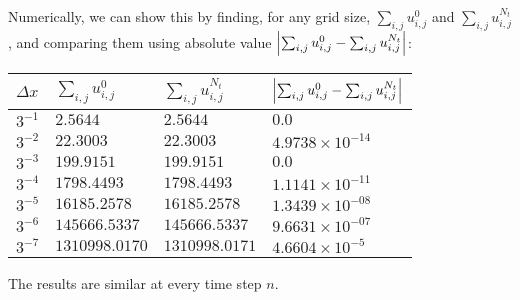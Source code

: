 \documentclass{article} %
\theoremstyle{plain}
\newcommand{\Dx}{\Delta x}
\numberwithin{equation}{section} %
\numberwithin{figure}{section} %
\numberwithin{table}{section} %
\begin{document}
\begin{enumerate}[\ \ (a)]
        Numerically, we can show this by finding, for any grid size, $\sum_{i,j}u_{i,j}^0$ and $\sum_{i,j}u_{i,j}^{N_t}$, and comparing them using absolute value $\abs{\sum_{i,j}u_{i,j}^0 - \sum_{i,j}u_{i,j}^{N_t}}$:
        \begin{table}[ht!]
            \centering
            \begin{tabular}{||l|l|l|l||}\hline\hline
                $\Dx$ & $\sum_{i,j}u_{i,j}^0$ & $\sum_{i,j}u_{i,j}^{N_t}$ & $\abs{\sum_{i,j}u_{i,j}^0 - \sum_{i,j}u_{i,j}^{N_t}}$ \\\hline\hline
                $3^{-1}$ & $2.5644$ & $2.5644$ & $0.0$ \\\hline
                $3^{-2}$ & $22.3003$ & $22.3003$ & $4.9738\times10^{-14}$ \\\hline
                $3^{-3}$ & $199.9151$ & $199.9151$ & $0.0$ \\\hline
                $3^{-4}$ & $1798.4493$ & $1798.4493$ & $1.1141\times10^{-11}$ \\\hline
                $3^{-5}$ & $16185.2578$ & $16185.2578$ & $1.3439\times10^{-08}$ \\\hline
                $3^{-6}$ & $145666.5337$ & $145666.5337$ & $9.6631\times10^{-07}$ \\\hline
                $3^{-7}$ & $1310998.0170$ & $1310998.0171$ & $4.6604\times10^{-5}$ \\\hline\hline
            \end{tabular}
        \end{table}
        The results are similar at every time step $n$.
\end{enumerate}
\end{document}
